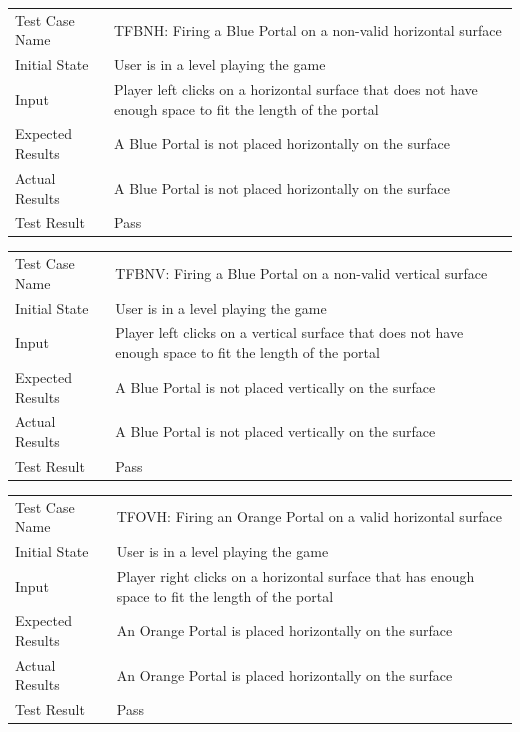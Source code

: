 \documentclass[12pt, titlepage]{article}
\begin{document}
\begin{center}
\begin{tabular}{ | l | p{10cm} | }
\hline
Test Case Name & TFBNH: Firing a Blue Portal on a non-valid horizontal surface	\\
Initial State & User is in a level playing the game	\\
Input & Player left clicks on a horizontal surface that does not have enough space to fit the length of the portal	\\
Expected Results & A Blue Portal is not placed horizontally on the surface	\\
Actual Results & A Blue Portal is not placed horizontally on the surface	\\
Test Result & Pass	\\
\hline
\end{tabular}
\end{center}

\begin{center}
\begin{tabular}{ | l | p{10cm} | }
\hline
Test Case Name & TFBNV: Firing a Blue Portal on a non-valid vertical surface	\\
Initial State & User is in a level playing the game	\\
Input & Player left clicks on a vertical surface that does not have enough space to fit the length of the portal	\\
Expected Results & A Blue Portal is not placed vertically on the surface	\\
Actual Results & A Blue Portal is not placed vertically on the surface	\\
Test Result & Pass	\\
\hline
\end{tabular}
\end{center}

\begin{center}
\begin{tabular}{ | l | p{10cm} | }
\hline
Test Case Name & TFOVH: Firing an Orange Portal on a valid horizontal surface	\\
Initial State & User is in a level playing the game	\\
Input & Player right clicks on a horizontal surface that has enough space to fit the length of the portal	\\
Expected Results & An Orange Portal is placed horizontally on the surface	\\
Actual Results & An Orange Portal is placed horizontally on the surface	\\
Test Result & Pass	\\
\hline
\end{tabular}
\end{center}
\end{document}
